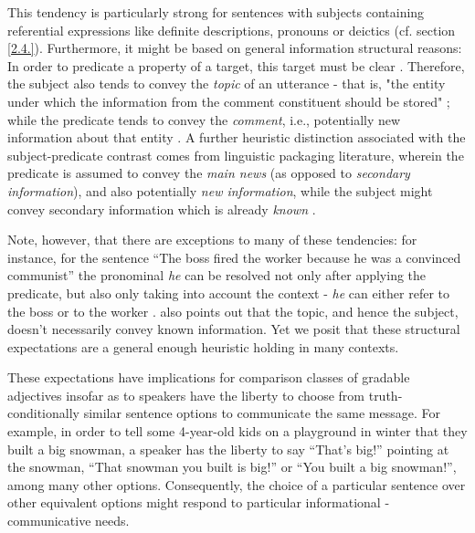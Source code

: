 This tendency is particularly strong for sentences with subjects containing referential expressions like definite descriptions, pronouns or deictics (cf. section \ref{2.4.}). Furthermore, it might be based on general information structural reasons: In order to predicate a property of a target, this target must be clear \parencite{searle1969speech, krifka2008basic}. Therefore, the subject also tends to convey the \textit{topic} of an utterance - that is, "the entity under which the information from the comment constituent should be stored" \parencite[p.X]{krifka2008basic}; while the predicate tends to convey the \textit{comment},  i.e., potentially new information about that entity \parencite{krifka2008basic, chafe1976givenness, Reboul2001}. A further heuristic distinction associated with the subject-predicate contrast comes from linguistic packaging literature, wherein the predicate is assumed to convey the \textit{main news} (as opposed to \textit{secondary information}), and also potentially \textit{new information}, while the subject might convey secondary information which is already \textit{known} \parencite{kaiser2020}. 

Note, however, that there are exceptions to many of these tendencies: for instance, for the sentence “The boss fired the worker because he was a convinced communist” the pronominal \emph{he} can be resolved not only after applying the predicate, but also only taking into account the context - \emph{he} can either refer to the boss or to the worker \parencite{Reboul2001}. \textcite{krifka2008basic} also points out that the topic, and hence the subject,  doesn't necessarily convey known information.
Yet we posit that these structural expectations are a general enough heuristic holding in many contexts.

These expectations have implications for comparison classes of gradable adjectives insofar as to speakers have the liberty to choose from truth-conditionally similar sentence options to communicate the same message. For example, in order to tell some 4-year-old kids on a playground in winter that they built a big snowman, a speaker has the liberty to say “That’s big!” pointing at the snowman, “That snowman you built is big!” or “You built a big snowman!”, among many other options. Consequently, the choice of a particular sentence over other equivalent options might respond to particular informational - communicative needs. 

